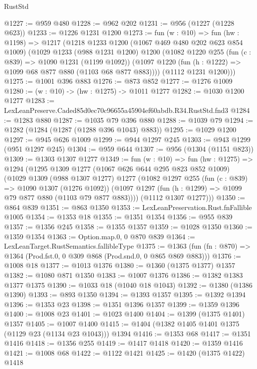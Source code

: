 \begin{lexlean}{RustStd}
\begin{coremodule}
@1227 := @959 @480
@1228 := @962 @202
@1231 := @956 (@1227 (@1228 @623))
@1233 := @1226 @1231 @1200
@1273 := fun (w : @10) =>
  fun (hw : @1198) =>
  @1217
    (@1218
      @1233
      @1200
      (@1067 @469 @480 @202 @623 @854 @1009)
      (@1029
        @1233
        (@988 @1231 @1200)
        @1200
        (@1082
          @1220
          @255
          (fun (c : @839) => @1090 @1231 (@1199 @1092))
          (@1097 @1220 (fun (h : @1222) => @1099 @68 @877 @880 (@1103 @68 @877 @883))))
        (@1112 @1231 @1200)))
@1275 := @1001 @396 @883
@1276 := @873 @852
@1277 := @1276 @1009
@1280 := (w : @10) -> (hw : @1275) -> @1011 @1277
@1282 := @1030 @1200 @1277
@1283 := LexLeanPreserve.Caded85d0ec70c96655a45904ef60abdb.R34.RustStd.fnd3
@1284 := @1283 @880
@1287 := @1035 @79 @396 @880
@1288 := @1039 @79
@1294 := @1282 (@1284 (@1287 (@1288 @396 @1043) @883))
@1295 := @1029 @1200
@1297 := @945 @626 @1009
@1299 := @944 @1297 @245
@1303 := @943 @1299 (@951 @1297 @245)
@1304 := @959 @644
@1307 := @956 (@1304 (@1151 @823))
@1309 := @1303 @1307 @1277
@1349 := fun (w : @10) =>
  fun (hw : @1275) =>
  @1294
    (@1295
      @1309
      @1277
      (@1067 @626 @644 @295 @823 @852 @1009)
      (@1029
        @1309
        (@988 @1307 @1277)
        @1277
        (@1082
          @1297
          @255
          (fun (c : @839) => @1090 @1307 (@1276 @1092))
          (@1097 @1297 (fun (h : @1299) => @1099 @79 @877 @880 (@1103 @79 @877 @883))))
        (@1112 @1307 @1277)))
@1350 := @864 @839
@1351 := @863 @1350
@1353 := LexLeanPreservation.Rust.fnFallible @1005
@1354 := @1353 @18
@1355 := @1351 @1354
@1356 := @955 @839
@1357 := @1356 @245
@1358 := @1355 @1357
@1359 := @1028 @1350
@1360 := @1359 @1354
@1363 := Option.map.{0, 0} @870 @839
@1364 := LexLeanTarget.RustSemantics.fallibleType
@1375 := @1363
    (fun (fn : @870) => @1364 (Prod.fst.{0, 0} @309 @868 (Prod.snd.{0, 0} @865 @869 @883)))
@1376 := @1008 @18
@1377 := @1013 @1376
@1380 := @1360 (@1375 @1377) @1357
@1382 := @1080 @871 @1350
@1383 := @1007 @1376
@1386 := @1382 @1383 @1377 @1375
@1390 := @1033 @18 (@1040 @18 @1043)
@1392 := @1380 (@1386 @1390)
@1393 := @893 @1350
@1394 := @1393 @1357
@1395 := @1392 @1394
@1396 := @1353 @23
@1398 := @1351 @1396 @1357
@1399 := @1359 @1396
@1400 := @1008 @23
@1401 := @1023 @1400
@1404 := @1399 (@1375 @1401) @1357
@1405 := @1007 @1400
@1415 := @1404 (@1382 @1405 @1401 @1375 (@1129 @23 (@1134 @23 @1043))) @1394
@1416 := @1353 @68
@1417 := @1351 @1416
@1418 := @1356 @255
@1419 := @1417 @1418
@1420 := @1359 @1416
@1421 := @1008 @68
@1422 := @1122 @1421
@1425 := @1420 (@1375 @1422) @1418

\end{coremodule}
\end{lexlean}
